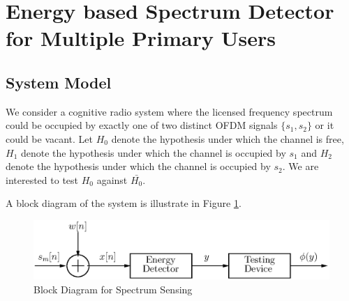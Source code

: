\section{Energy based Spectrum Detector for Multiple Primary Users}
\subsection{System Model}
We consider a cognitive radio system where the licensed frequency spectrum could be occupied by exactly one of two distinct OFDM signals $\{s_1, s_2\}$ or it could be vacant. Let $H_0$ denote the hypothesis under which the channel is free, ${H}_1$ denote the hypothesis under which the channel is occupied by $s_1$ and ${H}_2$ denote the hypothesis under which the channel is occupied by $s_2$. We are interested to test $H_0$ against $\bar{{H}_0}$.

A block diagram of the system is illustrate in Figure \ref{pic: block diagram}.

\begin{figure}[!hbp]
\centering
\includegraphics[width = \textwidth]{4/block_diagram.eps}
\caption{Block Diagram for Spectrum Sensing}
\label{pic: block diagram}
\end{figure}

